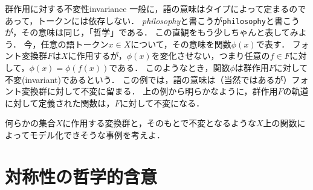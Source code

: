 \documentclass[11pt,a4paper]{jsarticle}
\begin{document}
\begin{rei}{群作用に対する不変性}{invariance}
一般に，語の意味はタイプによって定まるのであって，トークンには依存しない．
\textit{philosophy}と書こうが\texttt{philosophy}と書こうが，その意味は同じ，「哲学」である．
この直観をもう少しちゃんと表してみよう．
今，任意の語トークン$x \in X$について，その意味を関数$\phi(x)$で表す．
フォント変換群$F$は$X$に作用するが，$\phi(x)$を変化させない，つまり任意の$f \in F$に対して，$\phi(x) = \phi(f(x))$である．
このようなとき，関数$\phi$は群作用$F$に対して不変(invariant)であるという．
この例では，語の意味は（当然ではあるが）フォント変換群に対して不変に留まる．
上の例から明らかなように，群作用$F$の軌道に対して定義された関数は，$F$に対して不変になる．

\end{rei}


\begin{renshu}{}{}
 何らかの集合$X$に作用する変換群と，そのもとで不変となるような$X$上の関数によってモデル化できそうな事例を考えよ．
\end{renshu}


\section{対称性の哲学的含意}
\end{document}
